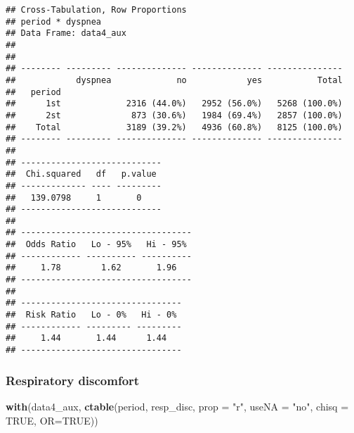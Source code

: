 \documentclass[
]{article}
\newenvironment{Shaded}{\begin{snugshade}}{\end{snugshade}}
\newcommand{\DataTypeTok}[1]{\textcolor[rgb]{0.13,0.29,0.53}{#1}}
\newcommand{\KeywordTok}[1]{\textcolor[rgb]{0.13,0.29,0.53}{\textbf{#1}}}
\newcommand{\NormalTok}[1]{#1}
\newcommand{\OtherTok}[1]{\textcolor[rgb]{0.56,0.35,0.01}{#1}}
\newcommand{\StringTok}[1]{\textcolor[rgb]{0.31,0.60,0.02}{#1}}
\begin{document}
\begin{verbatim}
## Cross-Tabulation, Row Proportions  
## period * dyspnea  
## Data Frame: data4_aux  
## 
## 
## -------- --------- -------------- -------------- ---------------
##            dyspnea             no            yes           Total
##   period                                                        
##      1st             2316 (44.0%)   2952 (56.0%)   5268 (100.0%)
##      2st              873 (30.6%)   1984 (69.4%)   2857 (100.0%)
##    Total             3189 (39.2%)   4936 (60.8%)   8125 (100.0%)
## -------- --------- -------------- -------------- ---------------
## 
## ----------------------------
##  Chi.squared   df   p.value 
## ------------- ---- ---------
##   139.0798     1       0    
## ----------------------------
## 
## ----------------------------------
##  Odds Ratio   Lo - 95%   Hi - 95% 
## ------------ ---------- ----------
##     1.78        1.62       1.96   
## ----------------------------------
## 
## --------------------------------
##  Risk Ratio   Lo - 0%   Hi - 0% 
## ------------ --------- ---------
##     1.44       1.44      1.44   
## --------------------------------
\end{verbatim}

\hypertarget{respiratory-discomfort-2}{%
\subsubsection{Respiratory discomfort}\label{respiratory-discomfort-2}}

\begin{Shaded}
\begin{Highlighting}[]
\KeywordTok{with}\NormalTok{(data4_aux, }\KeywordTok{ctable}\NormalTok{(period, resp_disc, }\DataTypeTok{prop =} \StringTok{"r"}\NormalTok{, }\DataTypeTok{useNA =} \StringTok{"no"}\NormalTok{, }\DataTypeTok{chisq =} \OtherTok{TRUE}\NormalTok{, }\DataTypeTok{OR=}\OtherTok{TRUE}\NormalTok{))}
\end{Highlighting}
\end{Shaded}
\end{document}
